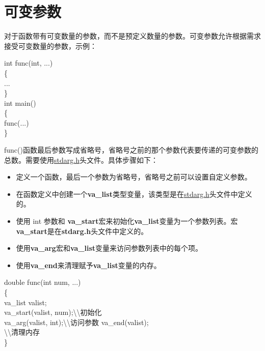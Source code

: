 \documentclass[UTF8]{ctexart}
\begin{document}
			\clearpage
			\section{可变参数}
			对于函数带有可变数量的参数，而不是预定义数量的参数。可变参数允许根据需求接受可变数量的参数，示例：\begin{framed}
				int func(int, ...)\\
				\{\\
					...\\
				\}\\
				int main()\\
				\{\\
					func(...)\\
				\}\\
			\end{framed}
			func()函数最后参数写成省略号，省略号之前的那个参数代表要传递的可变参数的总数。需要使用\underline{stdarg.h}头文件。具体步骤如下：\begin{itemize}
				\item 定义一个函数，最后一个参数为省略号，省略号之前可以设置自定义参数。
				\item 在函数定义中创建一个\textbf{va\_list}类型变量，该类型是在\underline{stdarg.h}头文件中定义的。
				\item 使用 int 参数和 \textbf{va\_start}宏来初始化\textbf{va\_list}变量为一个参数列表。宏\textbf{va\_start}是在\textbf{stdarg.h}头文件中定义的。
				\item 使用\textbf{va\_arg}宏和\textbf{va\_list}变量来访问参数列表中的每个项。
				\item 使用\textbf{va\_end}来清理赋予\textbf{va\_list}变量的内存。
			\end{itemize}
			\begin{framed}
				double func(int num, ...)\\
				\{\\
					va\_list valist;\\
					va\_start(valist, num);\textbackslash\textbackslash 初始化\\
					va\_arg(valist, int);\textbackslash\textbackslash 访问参数
					va\_end(valist);\\ \textbackslash\textbackslash 清理内存\\ 
				\}\\
			\end{framed}
\end{document}

